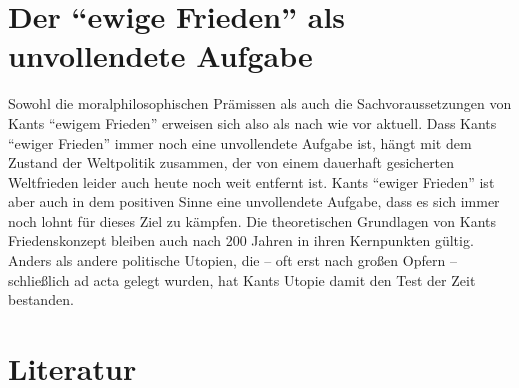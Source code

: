 \documentclass[12pt,a4paper,ngerman]{article}
\begin{document}
\section{Der "`ewige Frieden"' als unvollendete Aufgabe}

Sowohl die moralphilosophischen Prämissen als auch die
Sachvoraussetzungen von Kants "`ewigem Frieden"' erweisen sich also
als nach wie vor aktuell. Dass Kants "`ewiger Frieden"' immer noch
eine unvollendete Aufgabe ist, hängt mit dem Zustand der Weltpolitik
zusammen, der von einem dauerhaft gesicherten Weltfrieden leider auch
heute noch weit entfernt ist. Kants "`ewiger Frieden"' ist aber auch
in dem positiven Sinne eine unvollendete Aufgabe, dass es sich immer
noch lohnt für dieses Ziel zu kämpfen. Die theoretischen Grundlagen
von Kants Friedenskonzept bleiben auch nach 200 Jahren in ihren
Kernpunkten gültig. Anders als andere politische Utopien, die -- oft
erst nach großen Opfern -- schließlich ad acta gelegt wurden, hat
Kants Utopie damit den Test der Zeit bestanden.


\section{Literatur}
\end{document}
